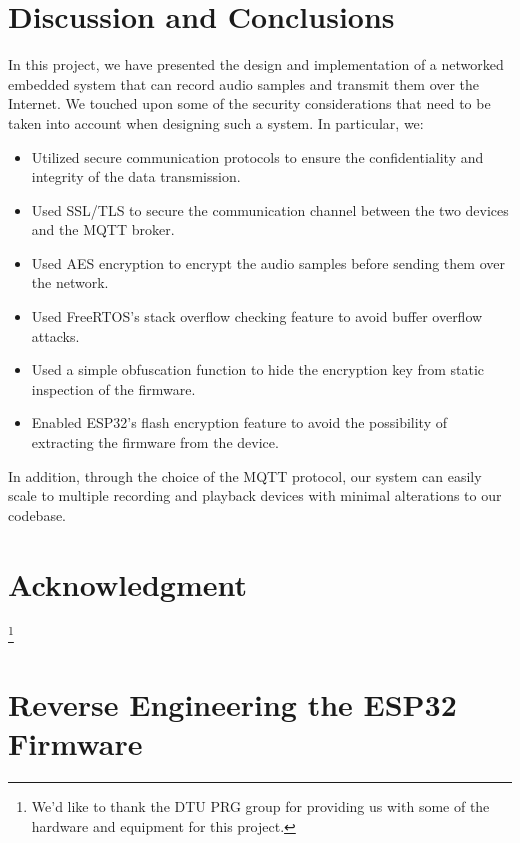 \documentclass[conference]{IEEEtran}
\begin{document}
\section{Discussion and Conclusions}
\label{sec:discussion_and_conclusions}

In this project, we have presented the design and implementation of a networked embedded system
that can record audio samples and transmit them over the Internet.
We touched upon some of the security considerations that need to be taken into account when designing such a system.
In particular, we:

\begin{itemize}
    \item Utilized secure communication protocols to ensure the confidentiality and integrity of the data transmission.
    \item Used SSL/TLS to secure the communication channel between the two devices and the MQTT broker.
    \item Used AES encryption to encrypt the audio samples before sending them over the network.
    \item Used FreeRTOS's stack overflow checking feature to avoid buffer overflow attacks.
    \item Used a simple obfuscation function to hide the encryption key from static inspection of the firmware.
    \item Enabled ESP32's flash encryption feature to avoid the possibility of extracting the firmware from the device.
\end{itemize}

In addition, through the choice of the MQTT protocol, our system can easily scale to multiple recording and playback devices
with minimal alterations to our codebase.

\section*{Acknowledgment}

\thanks{We'd like to thank the DTU PRG group for providing us with some of the hardware and equipment for this project.}




\appendices
{}

\section{Reverse Engineering the ESP32 Firmware}
\label{appendix:reverse_engineering}
\end{document}
